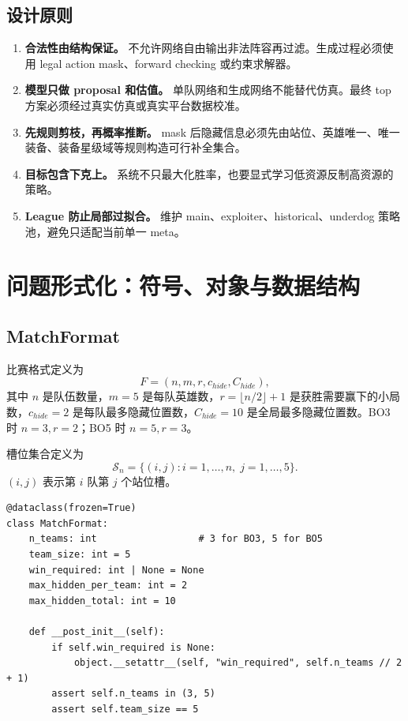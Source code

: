 \documentclass[UTF8,12pt,openany]{ctexbook}
\newcommand{\Scal}{\mathcal{S}}
\begin{document}
\section{设计原则}
\begin{enumerate}[leftmargin=2em]
\item \textbf{合法性由结构保证。} 不允许网络自由输出非法阵容再过滤。生成过程必须使用 legal action mask、forward checking 或约束求解器。
\item \textbf{模型只做 proposal 和估值。} 单队网络和生成网络不能替代仿真。最终 top 方案必须经过真实仿真或真实平台数据校准。
\item \textbf{先规则剪枝，再概率推断。} mask 后隐藏信息必须先由站位、英雄唯一、唯一装备、装备星级域等规则构造可行补全集合。
\item \textbf{目标包含下克上。} 系统不只最大化胜率，也要显式学习低资源反制高资源的策略。
\item \textbf{League 防止局部过拟合。} 维护 main、exploiter、historical、underdog 策略池，避免只适配当前单一 meta。
\end{enumerate}


\chapter{问题形式化：符号、对象与数据结构}

\section{MatchFormat}
比赛格式定义为
\begin{equation}
F=(n,m,r,c_{hide},C_{hide}),
\end{equation}
其中 $n$ 是队伍数量，$m=5$ 是每队英雄数，$r=\lfloor n/2\rfloor+1$ 是获胜需要赢下的小局数，$c_{hide}=2$ 是每队最多隐藏位置数，$C_{hide}=10$ 是全局最多隐藏位置数。BO3 时 $n=3,r=2$；BO5 时 $n=5,r=3$。

槽位集合定义为
\begin{equation}
\Scal_n=\{(i,j): i=1,\ldots,n,\; j=1,\ldots,5\}.
\end{equation}
$(i,j)$ 表示第 $i$ 队第 $j$ 个站位槽。

\begin{lstlisting}[caption={MatchFormat 数据结构}]
@dataclass(frozen=True)
class MatchFormat:
    n_teams: int                  # 3 for BO3, 5 for BO5
    team_size: int = 5
    win_required: int | None = None
    max_hidden_per_team: int = 2
    max_hidden_total: int = 10

    def __post_init__(self):
        if self.win_required is None:
            object.__setattr__(self, "win_required", self.n_teams // 2 + 1)
        assert self.n_teams in (3, 5)
        assert self.team_size == 5
\end{lstlisting}
\end{document}
